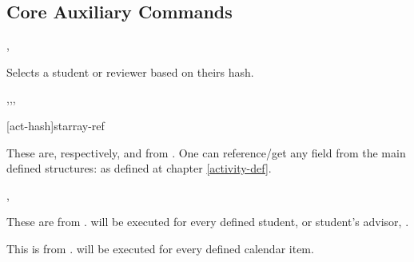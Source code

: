 \documentclass[article,nofontwarning,nogeometry,english,tocdepth=3,secdepth=3]{ufrgscca} %
\begin{document}
\subsection{Core Auxiliary Commands}


\begin{codedescribe}[code,new=2023/11/18]{\studentselect,\studentReviewerSelect}
	\begin{codesyntax}%
	\end{codesyntax}
Selects a student or reviewer based on theirs hash.
\end{codedescribe}




\begin{codedescribe}[code,new=2023/11/18,update=2024/04/18]{\DataFields,\eDataSet,\eDataFields,\DataGet}
	\begin{codesyntax}%
    \tsmacro{\eDataSet}[act-hash]{starray-ref}
	\end{codesyntax}
These are, respectively,  and  from . One can reference/get any field from the main  defined structures:  as defined at chapter \ref{activity-def}.
\end{codedescribe}


\begin{codedescribe}[code,new=2023/11/18,update=2023/12/02]{\studentiterate,\studentadvisoriterate}
	\begin{codesyntax}%
	\end{codesyntax}
These are  from .  will be executed for every defined student, \tsobj{\studentiterate} or student's advisor, \tsobj{\studentadvisoriterate}.
\end{codedescribe}

\begin{codedescribe}[code,new=2023/11/29]{\ActivityCalendarIterate}
	\begin{codesyntax}%
	\end{codesyntax}
This is  from .  will be executed for every defined calendar item.
\end{codedescribe}
\end{document}
